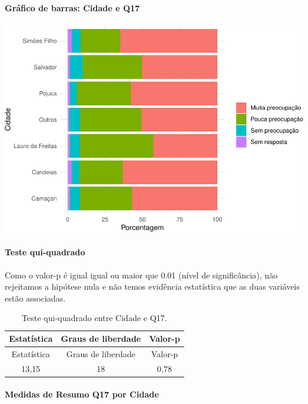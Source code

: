 \documentclass[]{article}
\let\oldparagraph\paragraph
\renewcommand{\paragraph}[1]{\oldparagraph{#1}\mbox{}}
\begin{document}
\hypertarget{gruxe1fico-de-barras-cidade-e-q17}{%
\paragraph{Gráfico de barras: Cidade e Q17}\label{gruxe1fico-de-barras-cidade-e-q17}}

\begin{center}\includegraphics[width=0.75\linewidth]{relatorio_covid19_files/figure-latex/unnamed-chunk-190-1} \end{center}

\hypertarget{teste-qui-quadrado-17}{%
\paragraph{Teste qui-quadrado}\label{teste-qui-quadrado-17}}

Como o valor-p é igual igual ou maior que 0.01 (nível de significância), não rejeitamos a hipótese nula e não temos evidência estatística que as duas variáveis estão associadas.

\begin{longtable}[]{@{}ccc@{}}
\caption{\label{tab:unnamed-chunk-192}Teste qui-quadrado entre Cidade e Q17.}\tabularnewline
\toprule
Estatística & Graus de liberdade & Valor-p\tabularnewline
\midrule
\endfirsthead
\toprule
Estatística & Graus de liberdade & Valor-p\tabularnewline
\midrule
\endhead
13,15 & 18 & 0,78\tabularnewline
\bottomrule
\end{longtable}

\cleardoublepage

\hypertarget{medidas-de-resumo-q17-por-cidade}{%
\paragraph{Medidas de Resumo Q17 por Cidade}\label{medidas-de-resumo-q17-por-cidade}}
\end{document}
